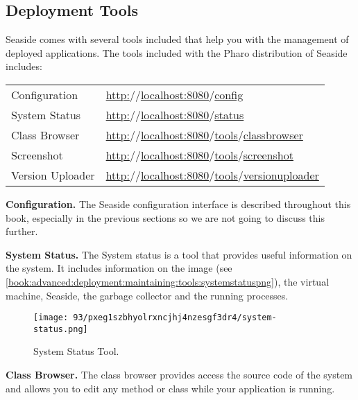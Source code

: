 \documentclass[a4paper,10pt,twoside]{book}
\begin{document}
\subsection{Deployment Tools}
\label{book:advanced:deployment:maintaining:tools}

Seaside comes with several tools included that help you with the management of deployed applications. The tools included with the Pharo distribution of Seaside includes:

\begin{tabularx}{\textwidth}{lX}
 Configuration & \href{http://localhost:8080/config}{http:$/$$/$localhost:8080$/$config} \\
 System Status & \href{http://localhost:8080/status}{http:$/$$/$localhost:8080$/$status}\\
 Class Browser & \href{http://localhost:8080/tools/classbrowser}{http:$/$$/$localhost:8080$/$tools$/$classbrowser}\\
 Screenshot & \href{http://localhost:8080/tools/screenshot}{http:$/$$/$localhost:8080$/$tools$/$screenshot}\\
 Version Uploader & \href{http://localhost:8080/tools/versionuploader}{http:$/$$/$localhost:8080$/$tools$/$versionuploader}\\
\end{tabularx}
\textbf{Configuration.} The Seaside configuration interface is described throughout this book, especially in the previous sections so we are not going to discuss this further.

\textbf{System Status.} The System status is a tool that provides useful information on the system. It includes information on the image (see \autoref{book:advanced:deployment:maintaining:tools:systemstatuspng}), the virtual machine, Seaside, the garbage collector and the running processes.

\begin{figure}[h!tbp]
	\begin{center}
		\texttt{[image: 93/pxeg1szbhyolrxncjhj4nzesgf3dr4/system-status.png]}
		\caption{System Status Tool.\label{book:advanced:deployment:maintaining:tools:systemstatuspng}}
	\end{center}
\end{figure}


\textbf{Class Browser.} The class browser provides access the source code of the system and allows you to edit any method or class while your application is running.
\end{document}
